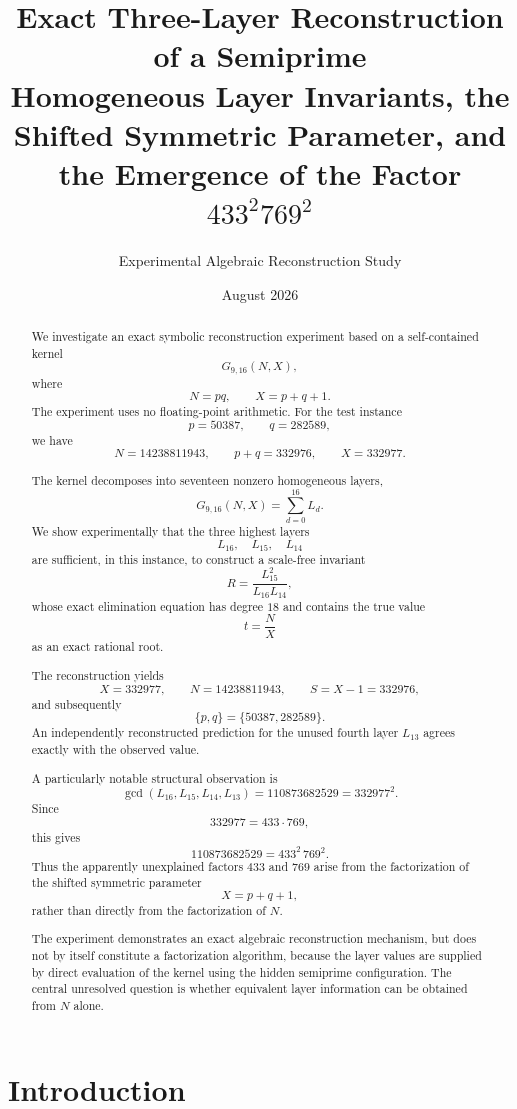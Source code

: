 \documentclass[11pt,a4paper]{article}
\title{
\textbf{Exact Three-Layer Reconstruction of a Semiprime}\\
\large Homogeneous Layer Invariants, the Shifted Symmetric Parameter,
and the Emergence of the Factor $433^2 769^2$
}
\author{
Experimental Algebraic Reconstruction Study
}
\date{August 2026}
\theoremstyle{definition}
\theoremstyle{remark}
\begin{document}
\maketitle

\begin{abstract}

We investigate an exact symbolic reconstruction experiment based on a
self-contained kernel
\[
G_{9,16}(N,X),
\]
where
\[
N=pq,
\qquad
X=p+q+1.
\]
The experiment uses no floating-point arithmetic.  For the test instance
\[
p=50387,\qquad q=282589,
\]
we have
\[
N=14238811943,
\qquad
p+q=332976,
\qquad
X=332977.
\]

The kernel decomposes into seventeen nonzero homogeneous layers,
\[
G_{9,16}(N,X)=\sum_{d=0}^{16}L_d.
\]
We show experimentally that the three highest layers
\[
L_{16},\quad L_{15},\quad L_{14}
\]
are sufficient, in this instance, to construct a scale-free invariant
\[
R=\frac{L_{15}^2}{L_{16}L_{14}},
\]
whose exact elimination equation has degree $18$ and contains the true value
\[
t=\frac{N}{X}
\]
as an exact rational root.

The reconstruction yields
\[
X=332977,
\qquad
N=14238811943,
\qquad
S=X-1=332976,
\]
and subsequently
\[
\{p,q\}=\{50387,282589\}.
\]
An independently reconstructed prediction for the unused fourth layer
$L_{13}$ agrees exactly with the observed value.

A particularly notable structural observation is
\[
\gcd(L_{16},L_{15},L_{14},L_{13})
=
110873682529
=
332977^2.
\]
Since
\[
332977=433\cdot769,
\]
this gives
\[
110873682529=433^2\,769^2.
\]
Thus the apparently unexplained factors $433$ and $769$ arise from the
factorization of the shifted symmetric parameter
\[
X=p+q+1,
\]
rather than directly from the factorization of $N$.

The experiment demonstrates an exact algebraic reconstruction mechanism,
but does not by itself constitute a factorization algorithm, because the
layer values are supplied by direct evaluation of the kernel using the
hidden semiprime configuration.  The central unresolved question is whether
equivalent layer information can be obtained from $N$ alone.

\end{abstract}

\tableofcontents

\newpage

\section{Introduction}
\end{document}

